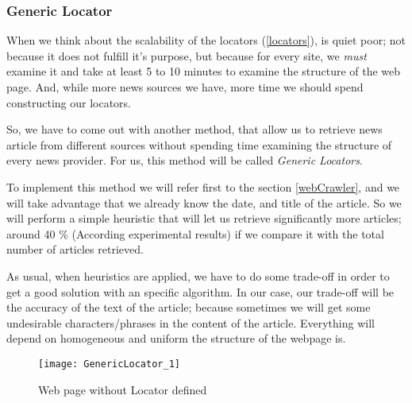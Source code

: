\subsubsection{Generic Locator}\label{genericLocator}

When we think about the scalability of the locators (\ref{locators}), is quiet poor; not because it does not fulfill it's purpose, but because for every site, we \emph{must} examine it and take at least 5 to 10 minutes to examine the structure of the web page. And, while more news sources we have, more time we should spend constructing our locators. 

So, we have to come out with another method, that allow us to retrieve news article from different sources without spending time examining the structure of every news provider. For us, this method will be called \emph{Generic Locators}. 

To implement this method we will refer first to the section \ref{webCrawler}, and we will take advantage that we already know the date, and title of the article. So we will perform a simple heuristic that will let us retrieve significantly more articles; around 40 \% (According experimental results) if we compare it with the total number of articles retrieved.

As usual, when heuristics are applied, we have to do some trade-off in order to get a good solution with an specific algorithm. In our case, our trade-off will be the accuracy of the text of the article; because sometimes we will get some undesirable characters/phrases in the content of the article. Everything will depend on homogeneous and uniform the structure of the webpage is.

\begin{figure}\centering
	\texttt{[image: GenericLocator\_1]}
	\caption{Web page without Locator defined}\label{fig:GL_1}
\end{figure}

